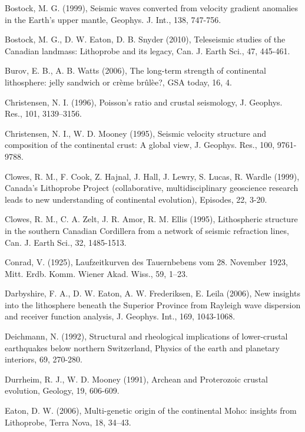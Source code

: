 \documentclass[msc,oneside]{ubcthesis}
\begin{document}
\begin{thebibliography}{1}

\bibitem{} Bostock, M. G. (1999), Seismic waves converted from velocity gradient anomalies in the Earth’s upper mantle, Geophys. J. Int., 138, 747-756.

\bibitem{} Bostock, M. G., D. W. Eaton, D. B. Snyder (2010), Teleseismic studies of the Canadian landmass: Lithoprobe and its legacy, Can. J. Earth Sci., 47, 445-461.

\bibitem{} Burov, E. B., A. B. Watts (2006), The long-term strength of continental lithosphere: jelly sandwich or cr\`{e}me br\^{u}l\`{e}e?, GSA today, 16, 4.

\bibitem{} Christensen, N. I. (1996), Poisson's ratio and crustal seismology, J. Geophys. Res., 101, 3139–3156.

\bibitem{} Christensen, N. I., W. D. Mooney (1995), Seismic velocity structure and composition of the continental crust: A global view, J. Geophys. Res., 100, 9761-9788.

\bibitem{} Clowes, R. M., F. Cook, Z. Hajnal, J. Hall, J. Lewry, S. Lucas, R. Wardle (1999), Canada's Lithoprobe Project (collaborative, multidisciplinary geoscience research leads to new understanding of continental evolution), Episodes, 22, 3-20.

\bibitem{} Clowes, R. M., C. A. Zelt, J. R. Amor, R. M. Ellis (1995), Lithospheric structure in the southern Canadian Cordillera from a network of seismic refraction lines, Can. J. Earth Sci., 32, 1485-1513.

\bibitem{} Conrad, V. (1925), Laufzeitkurven des Tauernbebens vom 28. November 1923, Mitt. Erdb. Komm. Wiener Akad. Wiss., 59, 1–23.

\bibitem{} Darbyshire, F. A., D. W. Eaton, A. W. Frederiksen, E. Leila (2006), New insights into the lithosphere beneath the Superior Province from Rayleigh wave dispersion and receiver function analysis, J. Geophys. Int., 169, 1043-1068.

\bibitem{} Deichmann, N. (1992), Structural and rheological implications of lower-crustal earthquakes below northern Switzerland, Physics of the earth and planetary interiors, 69, 270-280.

\bibitem{} Durrheim, R. J., W. D. Mooney (1991), Archean and Proterozoic crustal evolution, Geology, 19, 606-609.

\bibitem{} Eaton, D. W. (2006), Multi-genetic origin of the continental Moho: insights from Lithoprobe, Terra Nova, 18, 34–43.


\end{thebibliography}
\end{document}
